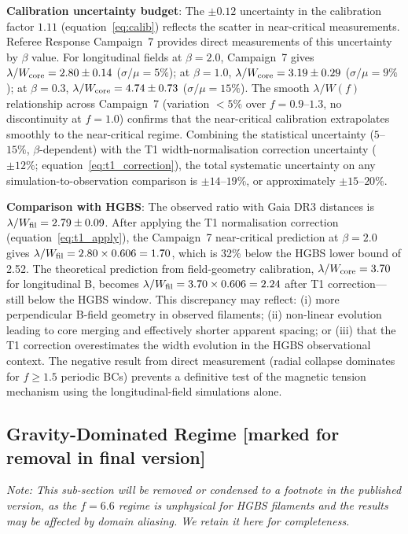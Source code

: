 \documentclass[twoside,twocolumn]{mnras}
\begin{document}
\textbf{Calibration uncertainty budget}: The $\pm 0.12$ uncertainty in the calibration factor $1.11$ (equation~\ref{eq:calib}) reflects the scatter in near-critical measurements. Referee Response Campaign~7 provides direct measurements of this uncertainty by $\beta$ value. For longitudinal fields at $\beta = 2.0$, Campaign~7 gives $\lambda/W_{\rm core} = 2.80 \pm 0.14$ ($\sigma/\mu = 5\%$); at $\beta = 1.0$, $\lambda/W_{\rm core} = 3.19 \pm 0.29$ ($\sigma/\mu = 9\%$); at $\beta = 0.3$, $\lambda/W_{\rm core} = 4.74 \pm 0.73$ ($\sigma/\mu = 15\%$). The smooth $\lambda/W(f)$ relationship across Campaign~7 (variation $<5\%$ over $f = 0.9$--$1.3$, no discontinuity at $f = 1.0$) confirms that the near-critical calibration extrapolates smoothly to the near-critical regime. Combining the statistical uncertainty ($5$--$15\%$, $\beta$-dependent) with the T1 width-normalisation correction uncertainty ($\pm 12\%$; equation~\ref{eq:t1_correction}), the total systematic uncertainty on any simulation-to-observation comparison is $\pm 14$--$19\%$, or approximately $\pm 15$--$20\%$.

\textbf{Comparison with HGBS}: The observed ratio with Gaia DR3 distances is $\lambda/W_{\rm fil} = 2.79 \pm 0.09$. After applying the T1 normalisation correction (equation~\ref{eq:t1_apply}), the Campaign~7 near-critical prediction at $\beta = 2.0$ gives $\lambda/W_{\rm fil} = 2.80 \times 0.606 = 1.70$, which is 32\% below the HGBS lower bound of 2.52. The theoretical prediction from field-geometry calibration, $\lambda/W_{\rm core} = 3.70$ for longitudinal B, becomes $\lambda/W_{\rm fil} = 3.70 \times 0.606 = 2.24$ after T1 correction---still below the HGBS window. This discrepancy may reflect: (i) more perpendicular B-field geometry in observed filaments; (ii) non-linear evolution leading to core merging and effectively shorter apparent spacing; or (iii) that the T1 correction overestimates the width evolution in the HGBS observational context. The negative result from direct measurement (radial collapse dominates for $f \geq 1.5$ periodic BCs) prevents a definitive test of the magnetic tension mechanism using the longitudinal-field simulations alone.


\subsection{Gravity-Dominated Regime [marked for removal in final version]}

\textit{Note: This sub-section will be removed or condensed to a footnote in the published version, as the $f = 6.6$ regime is unphysical for HGBS filaments and the results may be affected by domain aliasing. We retain it here for completeness.}
\end{document}

